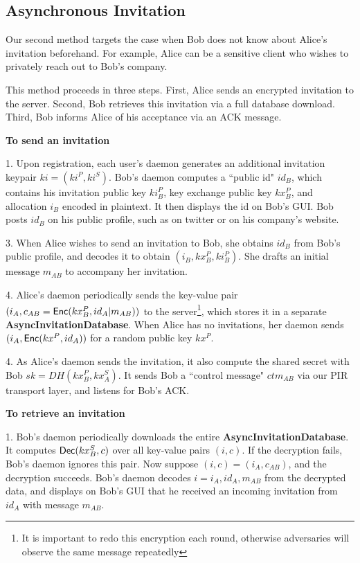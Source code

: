 \subsection{Asynchronous Invitation}


Our second method targets the case when Bob does not know about Alice's invitation beforehand. For example, Alice can be a sensitive client who wishes to privately reach out to Bob's company. 

This method proceeds in three steps. First, Alice sends an encrypted invitation to the server. Second, Bob retrieves this invitation via a full database download. Third, Bob informs Alice of his acceptance via an ACK message.

\textbf{To send an invitation}

1. Upon registration, each user's daemon generates an additional invitation keypair $ki = (ki^P, ki^S)$. Bob's daemon computes a ``public id" $id_B$, which contains his invitation public key $ki_B^P$, key exchange public key $kx_B^P$, and allocation $i_B$ encoded in plaintext. It then displays the id on Bob's GUI. Bob posts $id_B$ on his public profile, such as on twitter or on his company's website.

3. When Alice wishes to send an invitation to Bob, she obtains $id_B$ from Bob's public profile, and decodes it to obtain $(i_B, kx_B^P, ki_B^P)$. She drafts an initial message $m_{AB}$ to accompany her invitation. 

4. Alice's daemon periodically sends the key-value pair $(i_A, c_{AB} = \mathsf{Enc}(kx_B^P, id_A \vert m_{AB}))$ to the server\footnote{It is important to redo this encryption each round, otherwise adversaries will observe the same message repeatedly}, which stores it in a separate \textbf{AsyncInvitationDatabase}. When Alice has no invitations, her daemon sends $(i_A, \mathsf{Enc}(kx^P, id_A))$ for a random public key $kx^P$.

4. As Alice's daemon sends the invitation, it also compute the shared secret with Bob $sk = DH(kx_B^P, kx^S_A)$. It sends Bob a ``control message" $ctm_{AB}$ via our PIR transport layer, and listens for Bob's ACK.

\textbf{To retrieve an invitation}

1. Bob's daemon periodically downloads the entire \textbf{AsyncInvitationDatabase}. It computes $\mathsf{Dec}(kx^S_B, c)$ over all key-value pairs $(i, c)$. If the decryption fails, Bob's daemon ignores this pair. Now suppose $(i, c) = (i_A, c_{AB})$, and the decryption succeeds. Bob's daemon decodes $i = i_A, id_A, m_{AB}$ from the decrypted data, and displays on Bob's GUI that he received an incoming invitation from $id_A$ with message $m_{AB}$.

